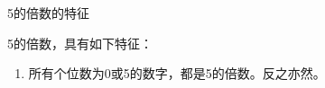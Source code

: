 \documentclass[aspectratio=169]{ctexbeamer} %
\date{\today}
\begin{document}
\begin{frame}[t]{5的倍数的特征}
\begin{spacing}{1.2}
\normalsize
5的倍数，具有如下特征：
\begin{enumerate}[label={\arabic*.}]
\item \alert{所有个位数为0或5的数字，都是5的倍数。反之亦然。}
\end{enumerate}

\end{spacing}
\end{frame}
\end{document}
